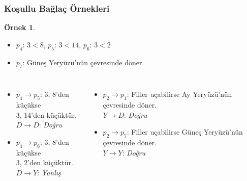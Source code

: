 \documentclass[dvipsnames]{beamer}
\theoremstyle{definition}
\theoremstyle{example}
\newtheorem{ornek}[theorem]{Örnek}
\theoremstyle{plain}
\begin{document}
\begin{frame}
  \frametitle{Koşullu Bağlaç Örnekleri}

  \begin{ornek}
    \begin{itemize}
      \item $p_4$: $3<8$, $p_5$: $3<14$, $p_6$: $3<2$
      \item $p_7$: Güneş Yeryüzü'nün çevresinde döner.
    \end{itemize}

    \pause
    \begin{columns}[t]
        \begin{itemize}
          \item $p_4 \rightarrow p_5$: 3, 8'den küçükse\\
            3, 14'den küçüktür.\\
            $D \rightarrow D$: \emph{Doğru}
          \pause
          \item $p_4 \rightarrow p_6$: 3, 8'den küçükse\\
            3, 2'den küçüktür.\\
            $D \rightarrow Y$: \emph{Yanlış}
        \end{itemize}

      \pause
        \begin{itemize}
          \item $p_2 \rightarrow p_1$: Filler uçabilirse Ay Yeryüzü'nün
            çevresinde döner.\\
            $Y \rightarrow D$: \emph{Doğru}
          \pause
          \item $p_2 \rightarrow p_7$: Filler uçabilirse Güneş Yeryüzü'nün
            çevresinde döner.\\
            $Y \rightarrow Y$: \emph{Doğru}
        \end{itemize}
    \end{columns}
  \end{ornek}
\end{frame}
\end{document}
